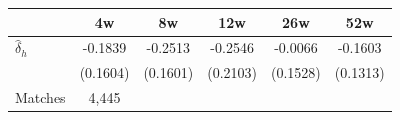\begin{tabular}{l*{5}{c}}
\toprule
 & 4w & 8w & 12w & 26w & 52w \\
\midrule
$\hat{\delta}_h$ & -0.1839 & -0.2513 & -0.2546 & -0.0066 & -0.1603 \\
 & (0.1604) & (0.1601) & (0.2103) & (0.1528) & (0.1313) \\
\midrule
Matches & 4,445 \\
\bottomrule
\end{tabular}
